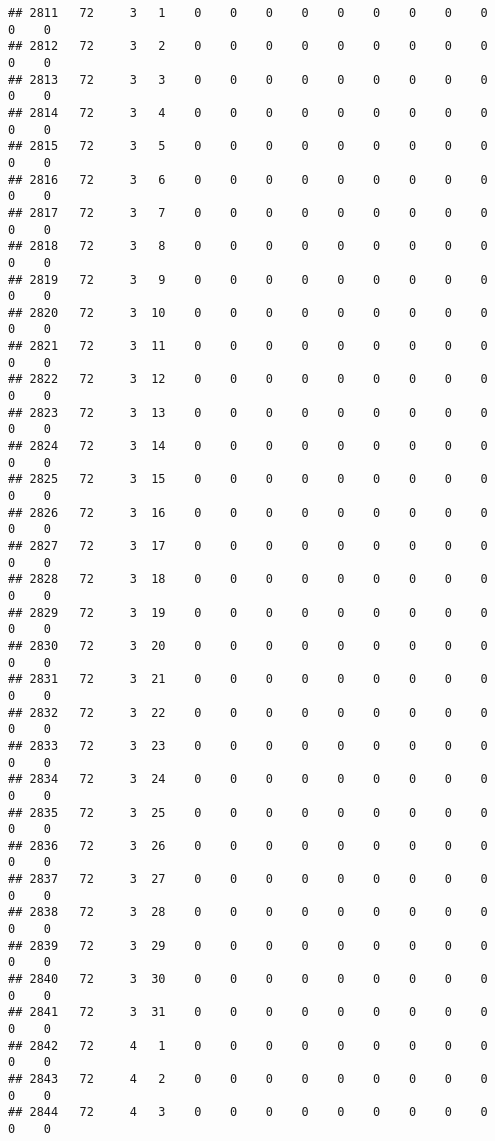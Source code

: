 \documentclass[]{article}
\begin{document}
\begin{verbatim}
## 2811   72     3   1    0    0    0    0    0    0    0    0    0    0    0
## 2812   72     3   2    0    0    0    0    0    0    0    0    0    0    0
## 2813   72     3   3    0    0    0    0    0    0    0    0    0    0    0
## 2814   72     3   4    0    0    0    0    0    0    0    0    0    0    0
## 2815   72     3   5    0    0    0    0    0    0    0    0    0    0    0
## 2816   72     3   6    0    0    0    0    0    0    0    0    0    0    0
## 2817   72     3   7    0    0    0    0    0    0    0    0    0    0    0
## 2818   72     3   8    0    0    0    0    0    0    0    0    0    0    0
## 2819   72     3   9    0    0    0    0    0    0    0    0    0    0    0
## 2820   72     3  10    0    0    0    0    0    0    0    0    0    0    0
## 2821   72     3  11    0    0    0    0    0    0    0    0    0    0    0
## 2822   72     3  12    0    0    0    0    0    0    0    0    0    0    0
## 2823   72     3  13    0    0    0    0    0    0    0    0    0    0    0
## 2824   72     3  14    0    0    0    0    0    0    0    0    0    0    0
## 2825   72     3  15    0    0    0    0    0    0    0    0    0    0    0
## 2826   72     3  16    0    0    0    0    0    0    0    0    0    0    0
## 2827   72     3  17    0    0    0    0    0    0    0    0    0    0    0
## 2828   72     3  18    0    0    0    0    0    0    0    0    0    0    0
## 2829   72     3  19    0    0    0    0    0    0    0    0    0    0    0
## 2830   72     3  20    0    0    0    0    0    0    0    0    0    0    0
## 2831   72     3  21    0    0    0    0    0    0    0    0    0    0    0
## 2832   72     3  22    0    0    0    0    0    0    0    0    0    0    0
## 2833   72     3  23    0    0    0    0    0    0    0    0    0    0    0
## 2834   72     3  24    0    0    0    0    0    0    0    0    0    0    0
## 2835   72     3  25    0    0    0    0    0    0    0    0    0    0    0
## 2836   72     3  26    0    0    0    0    0    0    0    0    0    0    0
## 2837   72     3  27    0    0    0    0    0    0    0    0    0    0    0
## 2838   72     3  28    0    0    0    0    0    0    0    0    0    0    0
## 2839   72     3  29    0    0    0    0    0    0    0    0    0    0    0
## 2840   72     3  30    0    0    0    0    0    0    0    0    0    0    0
## 2841   72     3  31    0    0    0    0    0    0    0    0    0    0    0
## 2842   72     4   1    0    0    0    0    0    0    0    0    0    0    0
## 2843   72     4   2    0    0    0    0    0    0    0    0    0    0    0
## 2844   72     4   3    0    0    0    0    0    0    0    0    0    0    0

\end{verbatim}
\end{document}
